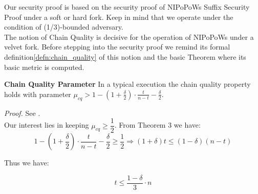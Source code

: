Our security proof is based on the security proof of NIPoPoWs Suffix Security Proof
under a soft or hard fork. Keep in mind that we operate under the condition of
(1/3)-bounded adversary.\\

The notion of Chain Quality is decisive for the operation of NIPoPoWs under a
velvet fork. Before stepping into the security proof we remind its formal
definition\ref{defn:chain_quality} of this notion and the basic Theorem where its basic metric is computed.\\


\begin{thm}{\textbf{Chain Quality Parameter}}
	In a typical execution the chain quality property holds with parameter $\mu_{cq} > 1 - (1 + \frac{\delta}{2}) \cdot \frac{t}{n-t} - \frac{\delta}{2}$.
\end{thm}
\textit{Proof.} See \cite{Backbone}.\\

Our interest lies in keeping $\mu_{cq} \geq \dfrac{1}{2}$.
From Theorem 3 we have:
\begin{equation*}
	1 - (1 + \frac{\delta}{2}) \cdot \frac{t}{n-t} - \frac{\delta}{2} \geq \dfrac{1}{2} \Rightarrow 
	(1 + \delta)t \leq (1-\delta)(n-t)
\end{equation*}

Thus we have:
\begin{center}
\begin{equation}
	t \leq \dfrac{1 - \delta}{3}\cdot n
\end{equation}
\end{center}


